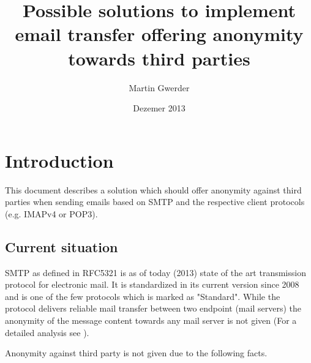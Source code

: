 \documentclass[11pt,a4paper]{book}
\begin{document}
\title{Possible solutions to implement email transfer offering anonymity towards 
third parties}
\author{Martin Gwerder}
\date{Dezemer 2013}
\maketitle

\begin{comment}
\begin{abstracts}        %
FIXME abstract is still missing
\end{abstracts}

\begin{acknowledgements}      %
FIXME family
FIXME Professor
FIXME university
\\
I would like to acknowledge the thousands of individuals who have coded for the LaTeX project for free. It is due to their efforts that we can generate professionally typeset PDFs now.
\end{acknowledgements}
\end{comment}
\tableofcontents

\chapter{Introduction}
This document describes a solution which should offer anonymity against third parties when sending emails based on SMTP and the respective client protocols (e.g. IMAPv4 or POP3).

\section{Current situation}
SMTP as defined in RFC5321\cite{RFC5321} is as of today (2013)  state of the art transmission protocol for electronic mail. It is standardized in its current version since 2008 and is one of the few protocols which is marked as "Standard". While the protocol delivers reliable mail transfer between two endpoint (mail servers) the anonymity of the message content towards any mail server is not given (For a detailed analysis see ).\par

Anonymity against third party is not given due to the following facts.
\end{document}

